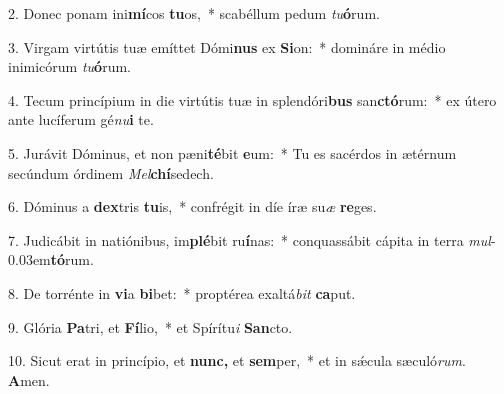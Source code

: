 \item 2. Donec ponam ini\textbf{mí}cos \textbf{tu}os,~* scabéllum pedum \textit{tu}\textbf{ó}rum.

\item 3. Virgam virtútis tuæ emíttet Dómi\textbf{nus} ex \textbf{Si}on:~* domináre in médio inimicórum \textit{tu}\textbf{ó}rum.

\item 4. Tecum princípium in die virtútis tuæ in splendóri\textbf{bus} san\textbf{ctó}rum:~* ex útero ante lucíferum gé\textit{nu}\textbf{i} te.

\item 5. Jurávit Dóminus, et non pæni\textbf{té}bit \textbf{e}um:~* Tu es sacérdos in ætérnum secúndum órdinem \textit{Mel}\textbf{chí}sedech.

\item 6.  Dóminus a \textbf{dex}tris \textbf{tu}is,~* confrégit in díe íræ su\hspace{0.03em}\textit{æ} \textbf{re}ges.

\item 7. Judicábit in natiónibus, im\textbf{plé}bit ru\textbf{í}nas:~* conquassábit cápita in terra \textit{mul}\kern -0.03em\textbf{tó}rum.

\item 8. De torrénte in \textbf{vi}a \textbf{bi}bet:~* proptérea exaltá\textit{bit} \textbf{ca}put.

\item 9. Glória \textbf{Pa}tri, et \textbf{Fí}lio,~* et Spírítu\textit{i} \textbf{San}cto.

\item 10. Sicut erat in princípio, et \textbf{nunc,} et \textbf{sem}per,~* et in sǽcula sæculó\textit{rum}. \textbf{A}men.